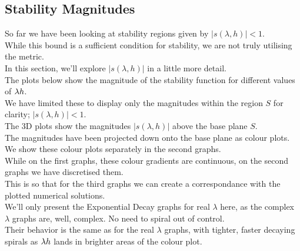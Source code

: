 \subsection{Stability Magnitudes}
So far we have been looking at stability regions given by $|s(\lambda, h)| < 1$.\\
While this bound is a sufficient condition for stability, we are not truly utilising the metric.\\
In this section, we'll explore $|s(\lambda, h)|$ in a little more detail.\\
The plots below show the magnitude of the stability function for different values of $\lambda h$.\\
We have limited these to display only the magnitudes within the region $S$ for clarity; $|s(\lambda, h)| < 1$.\\
The 3D plots show the magnitudes $|s(\lambda, h)|$ above the base plane $S$.\\
The magnitudes have been projected down onto the base plane as colour plots.\\
We show these colour plots separately in the second graphs.\\
While on the first graphs, these colour gradients are continuous, on the second graphs we have discretised them.\\
This is so that for the third graphs we can create a correspondance with the plotted numerical solutions.\\
We'll only present the Exponential Decay graphs for real $\lambda$ here, as the complex $\lambda$ graphs are, well, complex. No need to spiral out of control.\\
Their behavior is the same as for the real $\lambda$ graphs, with tighter, faster decaying spirals as $\lambda h$ lands in brighter areas of the colour plot.\\
